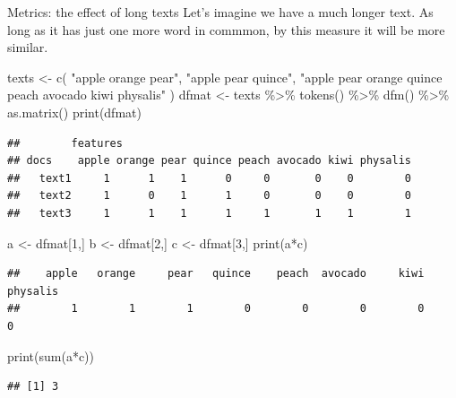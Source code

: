 \documentclass[
  10pt,
  ignorenonframetext,
  aspectratio=169]{beamer}
\newenvironment{Shaded}{\begin{snugshade}}{\end{snugshade}}
\newcommand{\DecValTok}[1]{\textcolor[rgb]{0.86,0.86,0.80}{#1}}
\newcommand{\FunctionTok}[1]{\textcolor[rgb]{0.94,0.94,0.56}{#1}}
\newcommand{\NormalTok}[1]{\textcolor[rgb]{0.80,0.80,0.80}{#1}}
\newcommand{\OtherTok}[1]{\textcolor[rgb]{0.94,0.94,0.56}{#1}}
\newcommand{\SpecialCharTok}[1]{\textcolor[rgb]{0.86,0.64,0.64}{#1}}
\newcommand{\StringTok}[1]{\textcolor[rgb]{0.80,0.58,0.58}{#1}}
\begin{document}
\begin{frame}[fragile]{Metrics: the effect of long texts}
\protect\hypertarget{metrics-the-effect-of-long-texts}{}
Let's imagine we have a much longer text. As long as it has just one
more word in commmon, by this measure it will be more similar.

\scriptsize

\begin{Shaded}
\begin{Highlighting}[]
\NormalTok{texts }\OtherTok{\textless{}{-}} \FunctionTok{c}\NormalTok{(}
  \StringTok{"apple orange pear"}\NormalTok{, }\StringTok{"apple pear quince"}\NormalTok{,}
  \StringTok{"apple pear orange quince peach avocado kiwi physalis"}
\NormalTok{)}
\NormalTok{dfmat }\OtherTok{\textless{}{-}}\NormalTok{ texts }\SpecialCharTok{\%\textgreater{}\%} \FunctionTok{tokens}\NormalTok{() }\SpecialCharTok{\%\textgreater{}\%} \FunctionTok{dfm}\NormalTok{() }\SpecialCharTok{\%\textgreater{}\%} \FunctionTok{as.matrix}\NormalTok{()}
\FunctionTok{print}\NormalTok{(dfmat)}
\end{Highlighting}
\end{Shaded}

\begin{verbatim}
##        features
## docs    apple orange pear quince peach avocado kiwi physalis
##   text1     1      1    1      0     0       0    0        0
##   text2     1      0    1      1     0       0    0        0
##   text3     1      1    1      1     1       1    1        1
\end{verbatim}

\begin{Shaded}
\begin{Highlighting}[]
\NormalTok{a }\OtherTok{\textless{}{-}}\NormalTok{ dfmat[}\DecValTok{1}\NormalTok{,]}
\NormalTok{b }\OtherTok{\textless{}{-}}\NormalTok{ dfmat[}\DecValTok{2}\NormalTok{,]}
\NormalTok{c }\OtherTok{\textless{}{-}}\NormalTok{ dfmat[}\DecValTok{3}\NormalTok{,]}
\FunctionTok{print}\NormalTok{(a}\SpecialCharTok{*}\NormalTok{c)}
\end{Highlighting}
\end{Shaded}

\begin{verbatim}
##    apple   orange     pear   quince    peach  avocado     kiwi physalis 
##        1        1        1        0        0        0        0        0
\end{verbatim}

\begin{Shaded}
\begin{Highlighting}[]
\FunctionTok{print}\NormalTok{(}\FunctionTok{sum}\NormalTok{(a}\SpecialCharTok{*}\NormalTok{c))}
\end{Highlighting}
\end{Shaded}

\begin{verbatim}
## [1] 3
\end{verbatim}
\end{frame}
\end{document}
